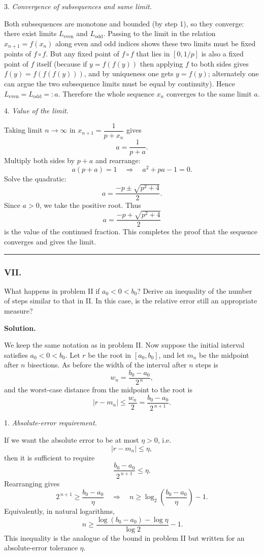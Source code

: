 \documentclass[a4paper]{article}
\begin{document}
3. \emph{Convergence of subsequences and same limit.}

Both subsequences are monotone and bounded (by step 1), so they converge:
there exist limits \(L_{\text{even}}\) and \(L_{\text{odd}}\). Passing to the
limit in the relation \(x_{n+1}=f(x_n)\) along even and odd indices shows
these two limits must be fixed points of \(f\circ f\). But any fixed point
of \(f\circ f\) that lies in \([0,1/p]\) is also a fixed point of \(f\)
itself (because if \(y=f(f(y))\) then applying \(f\) to both sides gives
\(f(y)=f(f(f(y)))\), and by uniqueness one gets \(y=f(y)\); alternately one
can argue the two subsequence limits must be equal by continuity). Hence
\(L_{\text{even}}=L_{\text{odd}}=:a\). Therefore the whole sequence \(x_n\)
converges to the same limit \(a\).

4. \emph{Value of the limit.}

Taking limit \(n\to\infty\) in \(x_{n+1}=\dfrac{1}{p+x_n}\) gives
\[
a=\frac{1}{p+a}.
\]
Multiply both sides by \(p+a\) and rearrange:
\[
a(p+a)=1 \quad\Longrightarrow\quad a^2 + p a -1 =0.
\]
Solve the quadratic:
\[
a=\frac{-p\pm\sqrt{p^2+4}}{2}.
\]
Since \(a>0\), we take the positive root. Thus
\[
\boxed{\,a=\frac{-p+\sqrt{p^2+4}}{2}\,}
\]
is the value of the continued fraction. This completes the proof that the
sequence converges and gives the limit.



\noindent\rule{\textwidth}{.4pt}

\subsubsection*{VII.}
What happens in problem II if $a_0 < 0 < b_0$? Derive an inequality of the number of steps similar to that in II. In this case, is the relative error still an appropriate measure?


\textbf{Solution.}

We keep the same notation as in problem II. Now suppose the initial
interval satisfies \(a_0<0<b_0\). Let \(r\) be the root in \([a_0,b_0]\),
and let \(m_n\) be the midpoint after \(n\) bisections. As before the
width of the interval after \(n\) steps is
\[
w_n=\frac{b_0-a_0}{2^{\,n}},
\]
and the worst-case distance from the midpoint to the root is
\[
|r-m_n|\le \frac{w_n}{2}=\frac{b_0-a_0}{2^{\,n+1}}.
\]

1. \emph{Absolute-error requirement.} 

If we want the absolute error to be at most
\(\eta>0\), i.e.
\[
|r-m_n|\le \eta,
\]
then it is sufficient to require
\[
\frac{b_0-a_0}{2^{\,n+1}}\le \eta.
\]
Rearranging gives
\[
2^{\,n+1}\ge \frac{b_0-a_0}{\eta}
\quad\Longrightarrow\quad
n \ge \log_2\!\left(\frac{b_0-a_0}{\eta}\right)-1.
\]
Equivalently, in natural logarithms,
\[
\boxed{\,n \ge \frac{\log(b_0-a_0)-\log\eta}{\log 2} - 1.}
\]
This inequality is the analogue of the bound in problem II but written
for an absolute-error tolerance \(\eta\).
\end{document}
